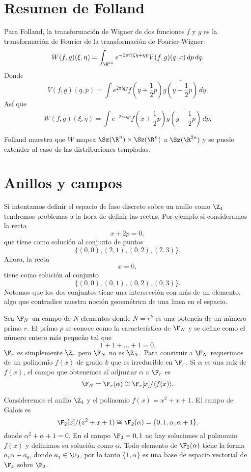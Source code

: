   \section{Resumen de Folland}

  Para Folland, la transformación de Wigner de dos funciones
  $f$ y $g$ es la transformación de Fourier de la
  transformación de Fourier-Wigner:
  \[
    W(f,g)(\xi, \eta)
    = \int_{\R^{2n}} e^{-2\pi i (\xi q + \eta p} V(f,g)(q,x)
    \, dp \, dq.
  \] 
  Donde
  \[
    V(f,g)(q,p)
    = \int e^{2\pi i q y} f(y + \frac{1}{2}p)\overline{g(y -
    \frac{1}{2}p)} \, dy.
  \] 
  Así que
  \[
    W(f,g)(\xi, \eta) = \int e^{-2\pi i \eta p }
    f(x+\frac{1}{2}p)\overline{g(y-\frac{1}{2}p)} \, dp.
  \] 

  Folland muestra que $W$ mapea $\Sz(\R^{n}) \times
  \Sz(\R^{n})$ a $\Sz(\R^{2n})$ y se puede extender al caso
  de las distribuciones templadas.

\section{Anillos y campos}

  Si intentamos definir el espacio de fase discreto sobre un
  anillo como $\Z_4$ tendremos problemas a la hora de
  definir las rectas. Por ejemplo si consideramos la recta
  \[
    x + 2p = 0,
  \]
  que tiene como solución al conjunto de puntos
  \[
    \{(0,0), (2,1), (0,2), (2,3)\}.
  \] 
  Ahora, la recta 
  \[
    x = 0,
  \] 
  tiene como solución al conjunto
  \[
    \{(0,0), (0,1), (0,2), (0,3)\}.
  \] 
  Notemos que los dos conjuntos tiene una intersección con
  más de un elemento, algo que contradice nuestra noción
  geoemétrica de una linea en el espacio.

  Sea $\F_N$ un campo de $N$ elementos donde $N = r^{k}$ es
  una potencia de un número primo $r$. El primo $p$ se
  conoce como la característica de $\F_N$ y se define como
  el número entero más pequeño tal que
  \[
    1 + 1 + \ldots + 1 = 0.
  \] 
  $\F_r$ es simplemente $\Z_r$ pero $\F_N$ no es $\Z_N$.
  Para construir a $\F_N$ requerimos de un polinomio $f(x)$ 
  de grado $k$ que es irreducible en $\F_r$. Si $\alpha$ es
  una raíz de $f(x)$, el campo que obtenemos al adjuntar
  $\alpha$ a $\F_r$ es
  \[
    \F_N
    = \F_r(\alpha) \cong \F_r[x] / \langle f(x) \rangle.
  \] 
  \begin{example}
    Consideremos el anillo $\Z_4$ y el polinomio $f(x) = x^2
    + x + 1$. El campo de Galois es
    \[
      \F_2[x] / (x^2 + x + 1)
      \cong \F_2(\alpha)
      = \{0, 1, \alpha, \alpha + 1\},
    \] 
    donde $\alpha^2 + \alpha + 1 = 0$. En el campo $\F_2 =
    {0,1}$ no hay soluciones al polinomio $f(x)$ y definimos
    su solución como $\alpha$. Todo elemento de
    $\F_2(\alpha)$ tiene la forma $a_1 \alpha + a_0$, donde
    $a_j \in \F_2$, por lo tanto $\{1, \alpha\}$ es una base
    de espacio vectorial de $\F_4$ sobre $\F_2$.
  \end{example}

